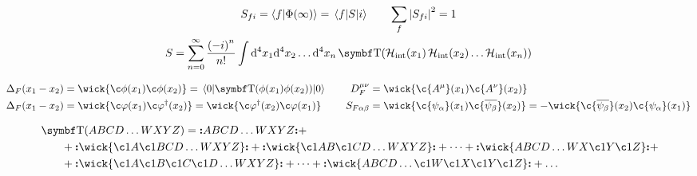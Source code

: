 \begin{gather*}
        S_{fi} = \braket{f}{\Phi(\infty)} = \mel{f}{S}{i}
        \qquad
        \sum_f \abs{S_{fi}}^2 = 1
        \\
        S = \sum_{n=0}^{\infty}\frac{\qty(-i)^n}{n!}\int\dd[4]x_1\dd[4]x_2\dots\dd[4]x_n\Tordp(\Hc_{\mathrm{int}}(x_1)\Hc_{\mathrm{int}}(x_2)\dots\Hc_{\mathrm{int}}(x_n))
\end{gather*}

\begin{alignat*}{4}
        \Delta_F(x_1-x_2)
        &= \wick{\c\phi(x_1)\c\phi(x_2)}
        =  \mel{0}{\Tordp(\phi(x_1)\phi(x_2))}{0}
        &\quad
        D_F^{\mu\nu}
        &= \wick{\c{A^{\mu}}(x_1)\c{A^\nu}(x_2)}
        \\
        \Delta_F(x_1-x_2)
        &= \wick{\c\varphi(x_1)\c\varphi^\dagger(x_2)}
        =  \wick{\c\varphi^\dagger(x_2)\c\varphi(x_1)}
        &\quad
        S_{F\alpha\beta}
        &= \wick{\c{\psi_\alpha}(x_1)\c{\overline{\psi_\beta}}(x_2)}
        = -\wick{\c{\overline{\psi_\beta}}(x_2) \c{\psi_\alpha}(x_1)}
\end{alignat*}

\begin{align*}
        &\Tordp(ABCD\dots WXYZ)
        = \nord{ABCD\dots WXYZ}
        +\\&\qquad
        + \nord{\wick{\c1{A}\c1{B}CD\dots WXYZ}} + \nord{\wick{\c1{A}B\c1{C}D\dots WXYZ}} + \dots + \nord{\wick{ABCD\dots WX\c1{Y}\c1{Z}}}
        +\\&\qquad
        + \nord{\wick{\c1{A}\c1{B}\c1{C}\c1{D}\dots WXYZ}} + \dots + \nord{\wick{ABCD\dots \c1{W}\c1{X}\c1{Y}\c1{Z}}}
        + \dots
\end{align*}
